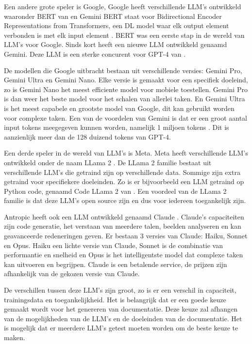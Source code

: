 Een andere grote speler is Google, Google heeft verschillende LLM's ontwikkeld waaronder BERT van \textcite{DevlinEtAl2019} en Gemini \autocite{Google2024}
BERT staat voor Bidirectional Encoder Representations from Transformers, een DL model waar elk output element verbonden is met elk input element \autocite{HashemiPour2024}.
BERT was een eerste stap in de wereld van LLM's voor Google. Sinds kort heeft \textcite{Google2024} een nieuwe LLM ontwikkeld genaamd Gemini.
Deze LLM is een sterke concurent voor GPT-4 van \textcite{OpenAI2023}. 

De modellen die Google \autocite{Google2024} uitbracht bestaan uit verschillende versies: Gemini Pro, Gemini Ultra en Gemini Nano. 
Elke versie is gemaakt voor een specifiek doeleind, zo is Gemini Nano het meest efficiente model voor mobiele toestellen. Gemini Pro is dan weer het beste model voor het schalen van allerlei taken.
En Gemini Ultra is het meest capabele en grootste model van Google, dit kan gebruikt worden voor complexe taken.
Een van de voordelen van Gemini is dat er een groot aantal input tokens meegegeven kunnen worden, namelijk 1 miljoen tokens \autocite{Google2024}.
Dit is aanzienlijk meer dan de 128 duizend tokens van GPT-4.

Een derde speler in de wereld van LLM's is Meta. Meta heeft verschillende LLM's ontwikkeld onder de naam LLama 2 \autocite{Meta2024}.
De LLama 2 familie bestaat uit verschillende LLM's die getraind zijn op verschillende data. Sommige zijn extra getraind voor specifiekere doeleinden.
Zo is er bijvoorbeeld een LLM getraind op Python code, genaamd Code LLama 2 van \textcite{Roziere2024}.
Een voordeel van de LLama 2 familie is dat deze LLM's open source zijn en dus voor iedereen toegankelijk zijn.

Antropic heeft ook een LLM ontwikkeld genaamd Claude \autocite{Anthropic2023}. 
Claude's capaciteiten zijn code generatie, het verstaan van meerdere talen, beelden analyseren en kan geavanceerde redeneringen geven.
Er bestaan 3 versies van Claude: Haiku, Sonnet en Opus.
Haiku een lichte versie van Claude, Sonnet is de combinatie van performantie en snelheid en Opus is het intelligentste model dat complexe taken kan uitvoeren en begrijpen.
Claude is een betalende service, de prijzen zijn afhankelijk van de gekozen versie van Claude.

De verschillen tussen deze LLM's zijn groot, zo is er een verschil in capaciteit, trainingsdata en toegankelijkheid.
Het is belangrijk dat er een goede keuze gemaakt wordt voor het genereren van documentatie.
Deze keuze zal afhangen van de mogelijkheden van de LLM's en de doeleinden van de documentatie.
Het is mogelijk dat er meerdere LLM's getest moeten worden om de beste keuze te maken.

